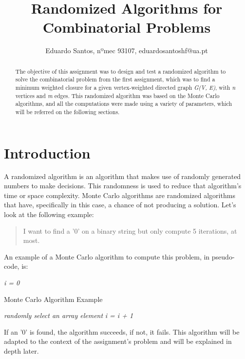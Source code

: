 \documentclass[...]{revdetua}
\begin{document}

\title{Randomized Algorithms for Combinatorial Problems}
\author{Eduardo Santos, nºmec 93107, eduardosantoshf@ua.pt} %
\maketitle

\begin{abstract}
The objective of this assignment was to design and test a randomized algorithm to solve the combinatorial problem from the first assignment, which was to find a minimum weighted closure for a given vertex-weighted directed graph \textit{G(V, E)}, with \textit{n} vertices and \textit{m} edges. This randomized algorithm was based on the Monte Carlo algorithms, and all the computations were made using a variety of parameters, which will be referred on the following sections.
\end{abstract}

\section{Introduction}

A randomized algorithm is an algorithm that makes use of randomly generated numbers to make decisions. This randomness is used to reduce that algorithm's time or space complexity. Monte Carlo algorithms are randomized algorithms that have, specifically in this case, a chance of not producing a solution. Let's look at the following example:
\begin{quote}
    I want to find a '0' on a binary string but only compute 5 iterations, at most.
\end{quote}

An example of a Monte Carlo algorithm to compute this problem, in pseudo-code, is:
\begin{algorithm}
\textit{i = 0}
\caption{Monte Carlo Algorithm Example} 
\begin{algorithmic}
    \Do
        \State \textit{randomly select an array element}
        \State \textit{i = i + 1}
\end{algorithmic}
\end{algorithm}

If an '0' is found, the algorithm succeeds, if not, it fails. This algorithm will be adapted to the context of the assignment's problem and will be explained in depth later.
\end{document}
